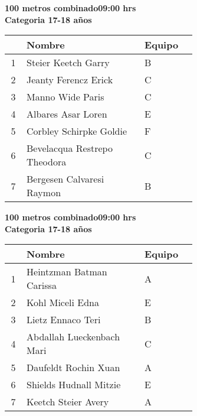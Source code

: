 \begin{minipage}{0.95\linewidth}\vspace{0.5cm} 
\begin{flushleft}
\textbf{
\hspace{-0.15cm}100 metros combinado\hspace{1.5cm}09:00 hrs \\Categoria 17-18 años}\vspace{-0.2cm} 
\end{flushleft}
\begin{tabular}{cp{0.63\linewidth}l}
\hline
& \textbf{Nombre} & \textbf{Equipo} \\ \hline
1 & Steier Keetch Garry & B \\ 
2 & Jeanty Ferencz Erick & C \\ 
3 & Manno Wide Paris & C \\ 
4 & Albares Asar Loren & E \\ 
5 & Corbley Schirpke Goldie & F \\ 
6 & Bevelacqua Restrepo Theodora & C \\ 
7 & Bergesen Calvaresi Raymon & B \\ 
\end{tabular}
\end{minipage}
\begin{minipage}{0.95\linewidth}\vspace{0.5cm} 
\begin{flushleft}
\textbf{
\hspace{-0.15cm}100 metros combinado\hspace{1.5cm}09:00 hrs \\Categoria 17-18 años}\vspace{-0.2cm} 
\end{flushleft}
\begin{tabular}{cp{0.63\linewidth}l}
\hline
& \textbf{Nombre} & \textbf{Equipo} \\ \hline
1 & Heintzman Batman Carissa & A \\ 
2 & Kohl Miceli Edna & E \\ 
3 & Lietz Ennaco Teri & B \\ 
4 & Abdallah Lueckenbach Mari & C \\ 
5 & Daufeldt Rochin Xuan & A \\ 
6 & Shields Hudnall Mitzie & E \\ 
7 & Keetch Steier Avery & A \\ 
\end{tabular}
\end{minipage}
